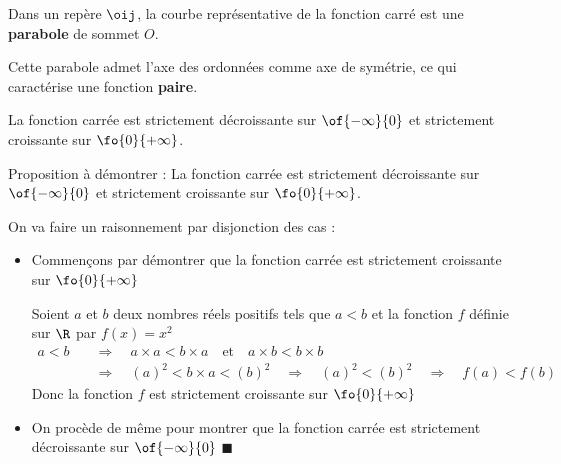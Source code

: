\medskip
\noindent Dans un repère $\oij$, la courbe représentative de la fonction carré est une \textbf{parabole} de sommet $O$.

\noindent Cette parabole admet l'axe des ordonnées comme axe de symétrie, ce qui caractérise une fonction \textbf{paire}.

\begin{prop}{}{}
La fonction carrée est strictement décroissante sur $\of{-\infty}{0}$ et strictement croissante sur $\fo{0}{+\infty}$.
\end{prop}

\begin{deme}{}{}
Proposition à démontrer : \og La fonction carrée est strictement décroissante sur $\of{-\infty}{0}$ et strictement croissante sur $\fo{0}{+\infty}$. \fg{} 

\medskip
On va faire un raisonnement par disjonction des cas :
\begin{itemize}
\item Commençons par démontrer que la fonction carrée est strictement croissante sur $\fo{0}{+\infty}$

\medskip
Soient $a$ et $b$ deux nombres réels positifs tels que $a<b$ et la fonction $f$ définie sur $\R$ par $f(x)=x^2$
\begin{align*}
a<b \quad &\Longrightarrow \quad a \times a < b \times a \quad \text{et}\quad a \times b < b \times b\\
&\Longrightarrow \quad (a)^2 < b \times a < (b)^2 \quad \Longrightarrow \quad (a)^2 < (b)^2 \quad \Longrightarrow \quad f(a) < f(b)
\end{align*} 
Donc la fonction $f$ est strictement croissante sur $\fo{0}{+\infty}$

\item  On procède de même pour montrer que la fonction carrée est strictement décroissante sur $\of{-\infty}{0}$ \hfill $\blacksquare$
\end{itemize}
\end{deme}

